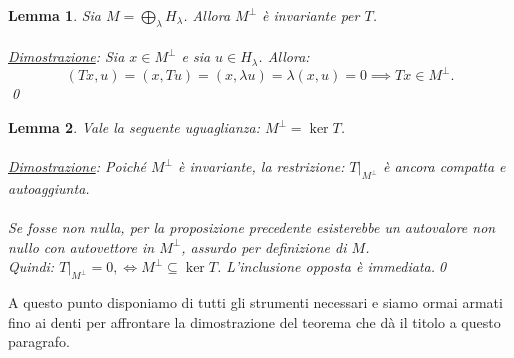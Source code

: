 \documentclass[a4paper,12pt]{report}
\newtheorem{lemma}{Lemma}[chapter]
\begin{document}
\vspace{0.5cm}
\begin{lemma}\label{lemm: 5.3}
Sia $M=\bigoplus_\lambda H_\lambda$. Allora $M^\perp$ è invariante per $T$.
\\
\\\underline{Dimostrazione}: Sia $x\in M^\perp$ e sia $u\in H_\lambda$. Allora:
\[
(Tx,u)
=
(x,Tu)
=
(x,\lambda u)
=
\lambda(x,u)
=
0\implies
Tx\in M^\perp.
\]\qed
\end{lemma}

\newpage

\begin{lemma}\label{lemm: 5.4}
Vale la seguente uguaglianza: $M^\perp=\ker T$.
\\
\\\underline{Dimostrazione}: Poiché $M^\perp$ è invariante, la restrizione: $T|_{M^\perp}$ è ancora compatta e autoaggiunta.
\\
\\Se fosse non nulla, per la proposizione precedente esisterebbe un autovalore non nullo con autovettore in $M^\perp$, assurdo per definizione di $M$.
\\Quindi: $T|_{M^\perp}=0,
\iff
M^\perp\subseteq\ker T$. L’inclusione opposta è immediata.\qed
\end{lemma}

A questo punto disponiamo di tutti gli strumenti necessari e siamo ormai armati fino ai denti per affrontare la dimostrazione del teorema che dà il titolo a questo paragrafo.
\end{document}
